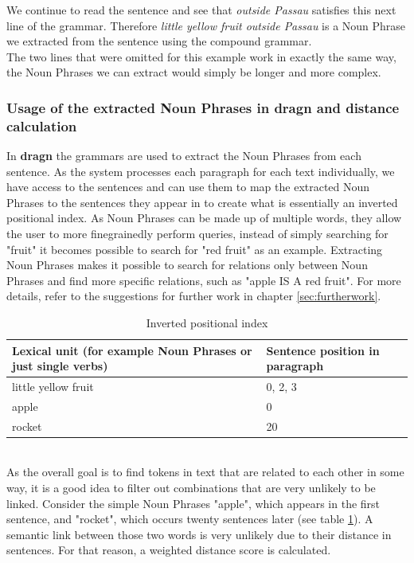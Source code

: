 We continue to read the sentence and see that \textit{outside Passau} satisfies this next line of the grammar. Therefore \textit{little yellow fruit outside Passau} is a Noun Phrase we extracted from the sentence using the compound grammar.\\
The two lines that were omitted for this example work in exactly the same way, the Noun Phrases we can extract would simply be longer and more complex.\\
\subsubsection{Usage of the extracted Noun Phrases in dragn and distance calculation}
In \textbf{dragn} the grammars are used to extract the Noun Phrases from each sentence. As the system processes each paragraph for each text individually, we have access to the sentences and can use them to map the extracted Noun Phrases to the sentences they appear in to create what is essentially an inverted positional index. As Noun Phrases can be made up of multiple words, they allow the user to more finegrainedly perform queries, instead of simply searching for "fruit" it becomes possible to search for "red fruit" as an example. Extracting Noun Phrases makes it possible to search for relations only between Noun Phrases and find more specific relations, such as "apple IS A red fruit". For more details, refer to the suggestions for further work in chapter \ref{sec:furtherwork}.
\begin{table}[h!]
\centering
\caption{Inverted positional index}
\label{table:inverted-posindex}
\begin{tabular}{l|l}
Lexical unit (for example Noun Phrases or just single verbs) & Sentence position in paragraph \\ \hline
little yellow fruit & 0, 2, 3 \\
apple & 0\\
rocket & 20\\
\end{tabular}
\end{table}
\\
As the overall goal is to find tokens in text that are related to each other in some way, it is a good idea to filter out combinations that are very unlikely to be linked. Consider the simple Noun Phrases "apple", which appears in the first sentence, and "rocket", which occurs twenty sentences later (see table \ref{table:inverted-posindex}). A semantic link between those two words is very unlikely due to their distance in sentences. For that reason, a weighted distance score is calculated.\\
